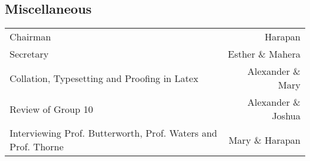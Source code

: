 \subsection*{Miscellaneous}

\begin{tabularx}{\textwidth}{X r}

  Chairman & Harapan \\
  Secretary & Esther \& Mahera \\
  Collation, Typesetting and Proofing in Latex & Alexander \& Mary \\
  Review of Group 10 & Alexander \& Joshua \\
  Interviewing Prof. Butterworth, Prof. Waters and Prof. Thorne & Mary \& Harapan \\
  
\end{tabularx}
